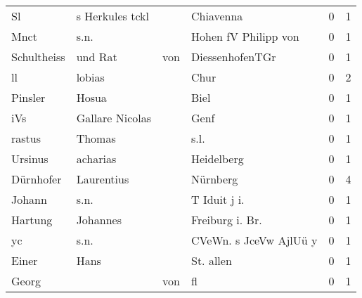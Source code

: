 \begin{center}
\begin{tiny}
\begin{longtabu}{llllrr}
                       Sl &                    s Herkules tckl &             &                                   Chiavenna &          0 &         1 \\
                     Mnct &                               s.n. &             &                        Hohen fV Philipp von &          0 &         1 \\
              Schultheiss &                            und Rat &         von &                             DiessenhofenTGr &          0 &         1 \\
                       ll &                             lobias &             &                                        Chur &          0 &         2 \\
                  Pinsler &                              Hosua &             &                                        Biel &          0 &         1 \\
                      iVs &                    Gallare Nicolas &             &                                        Genf &          0 &         1 \\
                   rastus &                             Thomas &             &                                        s.l. &          0 &         1 \\
                  Ursinus &                           acharias &             &                                  Heidelberg &          0 &         1 \\
                Dürnhofer &                         Laurentius &             &                                    Nürnberg &          0 &         4 \\
                   Johann &                               s.n. &             &                               T Iduit j i.  &          0 &         1 \\
                  Hartung &                           Johannes &             &                            Freiburg i. Br.  &          0 &         1 \\
                       yc &                               s.n. &             &                      CVeWn. s JceVw AjlUü y &          0 &         1 \\
                    Einer &                               Hans &             &                                   St. allen &          0 &         1 \\
                    Georg &                                    &         von &                                          fl &          0 &         1 \\

\end{longtabu}
\end{tiny}
\end{center}
